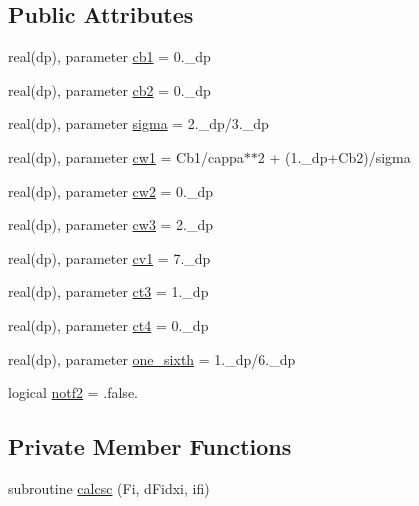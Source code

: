 \subsection*{Public Attributes}
\begin{DoxyCompactItemize}
\item 
real(dp), parameter \hyperlink{classspalart__allmaras_a9d7b9d672e665dd9087dc129c60ece92}{cb1} = 0.\-\_\-dp
\item 
real(dp), parameter \hyperlink{classspalart__allmaras_a0e36dab78c6947bce8c72722f7b571ad}{cb2} = 0.\-\_\-dp
\item 
real(dp), parameter \hyperlink{classspalart__allmaras_aaaa63e9dac449d479c165c41d1061ba3}{sigma} = 2.\-\_\-dp/3.\-\_\-dp
\item 
real(dp), parameter \hyperlink{classspalart__allmaras_aa2fc9c497373807297913792495c02f2}{cw1} = Cb1/cappa$\ast$$\ast$2 + (1.\-\_\-dp+\-Cb2)/sigma
\item 
real(dp), parameter \hyperlink{classspalart__allmaras_a4f44f3a16265f791c1b6ba3c9d585901}{cw2} = 0.\-\_\-dp
\item 
real(dp), parameter \hyperlink{classspalart__allmaras_a2542bc152a4a8bbcbf9771d1e28367e1}{cw3} = 2.\-\_\-dp
\item 
real(dp), parameter \hyperlink{classspalart__allmaras_a5576822114d4af2ba1427254bd9da98a}{cv1} = 7.\-\_\-dp
\item 
real(dp), parameter \hyperlink{classspalart__allmaras_abeaeefe8f5b898168786a0b87152baef}{ct3} = 1.\-\_\-dp
\item 
real(dp), parameter \hyperlink{classspalart__allmaras_a614ff8dcaa3500e88090ebe3f47bf865}{ct4} = 0.\-\_\-dp
\item 
real(dp), parameter \hyperlink{classspalart__allmaras_a48f17147ce3b6ac45942326ca60b10bc}{one\-\_\-sixth} = 1.\-\_\-dp/6.\-\_\-dp
\item 
logical \hyperlink{classspalart__allmaras_a92e4e7942f6af90a9fdd441c4cb1f3d2}{notf2} = .false.
\end{DoxyCompactItemize}
\subsection*{Private Member Functions}
\begin{DoxyCompactItemize}
\item 
subroutine \hyperlink{classspalart__allmaras_a3c8995acd330b84699656b63e89c85b3}{calcsc} (Fi, d\-Fidxi, ifi)
\end{DoxyCompactItemize}


